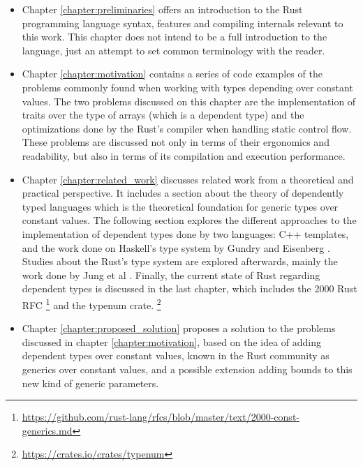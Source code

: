 \begin{itemize}
    \item Chapter \ref{chapter:preliminaries} offers an introduction to the Rust programming language syntax, features and compiling internals relevant to this work. This chapter does not intend to be a full introduction to the language, just an attempt to set common terminology with the reader.
    \item Chapter \ref{chapter:motivation} contains a series of code examples of the problems commonly found when working with types depending over constant values. The two problems discussed on this chapter are the implementation of traits over the type of arrays (which is a dependent type) and the optimizations done by the Rust's compiler when handling static control flow. These problems are discussed not only in terms of their ergonomics and readability, but also in terms of its compilation and execution performance.
    \item Chapter \ref{chapter:related_work} discusses related work from a theoretical and practical perspective. It includes a section about the theory of dependently typed languages which is the theoretical foundation for generic types over constant values. The following section explores the different approaches to the implementation of dependent types done by two languages: C++ templates, and the work done on Haskell's type system by Gundry \cite{gundry} and Eisenberg \cite{eisenberg}. Studies about the Rust's type system are explored afterwards, mainly the work done by Jung et al \cite{ralf}. Finally, the current state of Rust regarding dependent types is discussed in the last chapter, which includes the 2000 Rust RFC \footnote{\url{https://github.com/rust-lang/rfcs/blob/master/text/2000-const-generics.md}} and the typenum crate. \footnote{\url{https://crates.io/crates/typenum}}
    \item Chapter \ref{chapter:proposed_solution} proposes a solution to the problems discussed in chapter \ref{chapter:motivation}, based on the idea of adding dependent types over constant values, known in the Rust community as generics over constant values, and a possible extension adding bounds to this new kind of generic parameters.
\end{itemize}
